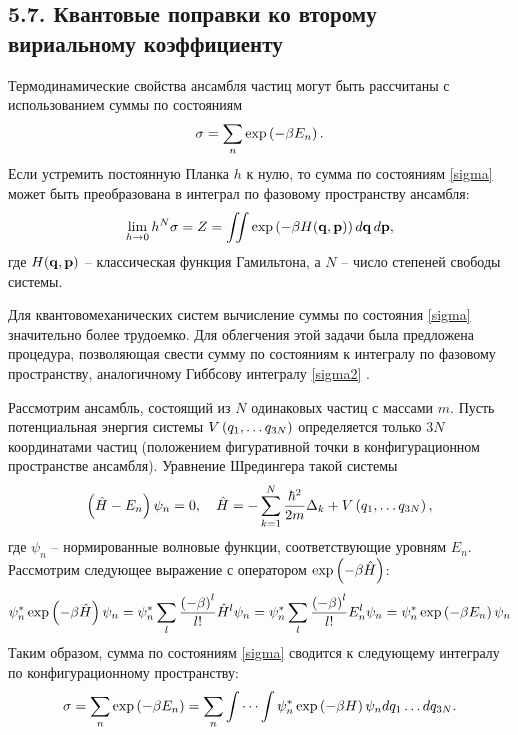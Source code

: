 \subsection*{\textbf{5.7.} Квантовые поправки ко второму вириальному коэффициенту}

Термодинамические свойства ансамбля частиц могут быть рассчитаны с использованием суммы по состояниям
\vverh
\begin{gather}
	\sigma = \sum_n \exp \left( - \beta E_n \right). \label{sigma}  
\end{gather}
Если устремить постоянную Планка $h$ к нулю, то сумма по состояниям \eqref{sigma} может быть преобразована в интеграл по фазовому пространству ансамбля:
\vverh
\begin{gather}
	\lim_{h \rightarrow 0} h^N \sigma = Z = \iint \exp \left( - \beta H(\mathbf{q}, \mathbf{p}) \right) d \mathbf{q} \, d \mathbf{p}, \label{sigma2}
\end{gather}
где $H(\mathbf{q}, \mathbf{p})$ -- классическая функция Гамильтона, а $N$ -- число степеней свободы системы. \par
Для квантовомеханических систем вычисление суммы по состояния \eqref{sigma} значительно более трудоемко. Для облегчения этой задачи была предложена процедура, позволяющая свести сумму по состояниям к интегралу по фазовому пространству, аналогичному Гиббсову интегралу \eqref{sigma2} \cite{kirkwood1933}. \par 
Рассмотрим ансамбль, состоящий из $N$ одинаковых частиц с массами $m$. Пусть потенциальная энергия системы $V \left( q_1, \dots q_{3N} \right)$  определяется только $3 N$ координатами частиц (положением фигуративной точки в конфигурационном пространстве ансамбля). Уравнение Шредингера такой системы 
\vverh
\begin{gather}
	\left( \hat{H} - E_n \right) \psi_n = 0, \quad \hat{H} = - \sum_{k = 1}^{N} \frac{\hbar^2}{2m} \Delta_k + V \left( q_1, \dots q_{3N} \right), \notag 
\end{gather}
где $\psi_n$ -- нормированные волновые функции, соответствующие уровням $E_n$. Рассмотрим следующее выражение с оператором $\exp \left( - \beta \hat{H }\right)$:
\vverh
\begin{gather}
	\psi_n^{*} \exp \left( - \beta \hat{H} \right) \psi_n = \psi_n^{*} \sum_l \frac{ \left( - \beta \right)^l}{l!} \hat{H}^l \psi_n = \psi_n^{*} \sum_l \frac{ \left( - \beta \right)^l}{l!} E_n^l \psi_n = \psi_n^{*} \exp \left( - \beta E_n \right) \psi_n 
\end{gather}
Таким образом, сумма по состояниям \eqref{sigma} сводится к следующему интегралу по конфигурационному пространству:
\vverh
\begin{gather}
	\sigma = \sum_n \exp \left( - \beta E_n \right) = \sum_n \idotsint \psi_n^{*} \exp \left( - \beta H \right) \psi_n d q_1 \dots d q_{3N}. \label{sigma3}  
\end{gather}

